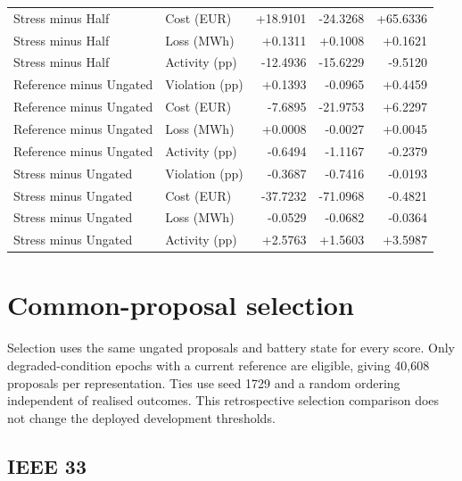 \documentclass[11pt]{article}
\begin{document}
\begin{longtable}{llrrr}
Stress minus Half & Cost (EUR) & +18.9101 & -24.3268 & +65.6336\\
Stress minus Half & Loss (MWh) & +0.1311 & +0.1008 & +0.1621\\
Stress minus Half & Activity (pp) & -12.4936 & -15.6229 & -9.5120\\
Reference minus Ungated & Violation (pp) & +0.1393 & -0.0965 & +0.4459\\
Reference minus Ungated & Cost (EUR) & -7.6895 & -21.9753 & +6.2297\\
Reference minus Ungated & Loss (MWh) & +0.0008 & -0.0027 & +0.0045\\
Reference minus Ungated & Activity (pp) & -0.6494 & -1.1167 & -0.2379\\
Stress minus Ungated & Violation (pp) & -0.3687 & -0.7416 & -0.0193\\
Stress minus Ungated & Cost (EUR) & -37.7232 & -71.0968 & -0.4821\\
Stress minus Ungated & Loss (MWh) & -0.0529 & -0.0682 & -0.0364\\
Stress minus Ungated & Activity (pp) & +2.5763 & +1.5603 & +3.5987\\
\end{longtable}\normalsize
\section{Common-proposal selection}
Selection uses the same ungated proposals and battery state for every score. Only degraded-condition epochs with a current reference are eligible, giving 40,608 proposals per representation. Ties use seed 1729 and a random ordering independent of realised outcomes. This retrospective selection comparison does not change the deployed development thresholds.
\subsection{IEEE 33}
\end{document}
